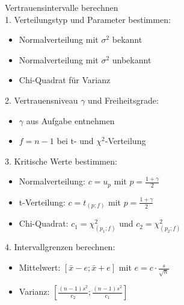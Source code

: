 \begin{KR}{Vertrauensintervalle berechnen}\\
1. Verteilungstyp und Parameter bestimmen:
   \begin{itemize}
     \item Normalverteilung mit $\sigma^2$ bekannt
     \item Normalverteilung mit $\sigma^2$ unbekannt
     \item Chi-Quadrat für Varianz
   \end{itemize}

2. Vertrauensniveau $\gamma$ und Freiheitsgrade:
   \begin{itemize}
     \item $\gamma$ aus Aufgabe entnehmen
     \item $f = n-1$ bei t- und $\chi^2$-Verteilung
   \end{itemize}

3. Kritische Werte bestimmen:
   \begin{itemize}
     \item Normalverteilung: $c = u_p$ mit $p = \frac{1+\gamma}{2}$
     \item t-Verteilung: $c = t_{(p;f)}$ mit $p = \frac{1+\gamma}{2}$
     \item Chi-Quadrat: $c_1 = \chi^2_{(p_1;f)}$ und $c_2 = \chi^2_{(p_2;f)}$
   \end{itemize}

4. Intervallgrenzen berechnen:
   \begin{itemize}
     \item Mittelwert: $[\bar{x} - e; \bar{x} + e]$ mit $e = c \cdot \frac{s}{\sqrt{n}}$
     \item Varianz: $[\frac{(n-1)s^2}{c_2}; \frac{(n-1)s^2}{c_1}]$
   \end{itemize}
\end{KR}

